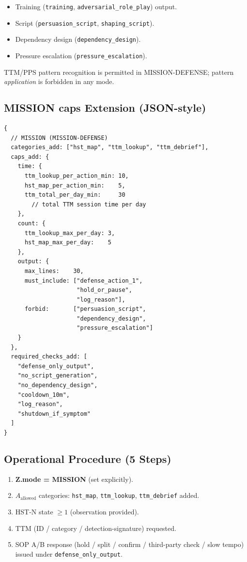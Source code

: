 \begin{itemize}
\item Training (\texttt{training}, \texttt{adversarial\_role\_play})
output.
\item Script (\texttt{persuasion\_script}, \texttt{shaping\_script}).
\item Dependency design (\texttt{dependency\_design}).
\item Pressure escalation (\texttt{pressure\_escalation}).
\end{itemize}

\noindent
TTM/PPS pattern recognition is permitted in MISSION-DEFENSE; pattern
\emph{application} is forbidden in any mode.

\subsection{MISSION caps Extension (JSON-style)}
\label{sec:mission-defense-caps}

\begin{lstlisting}[basicstyle=\ttfamily\scriptsize,frame=single]
{
  // MISSION (MISSION-DEFENSE)
  categories_add: ["hst_map", "ttm_lookup", "ttm_debrief"],
  caps_add: {
    time: {
      ttm_lookup_per_action_min: 10,
      hst_map_per_action_min:    5,
      ttm_total_per_day_min:     30
        // total TTM session time per day
    },
    count: {
      ttm_lookup_max_per_day: 3,
      hst_map_max_per_day:    5
    },
    output: {
      max_lines:    30,
      must_include: ["defense_action_1",
                     "hold_or_pause",
                     "log_reason"],
      forbid:       ["persuasion_script",
                     "dependency_design",
                     "pressure_escalation"]
    }
  },
  required_checks_add: [
    "defense_only_output",
    "no_script_generation",
    "no_dependency_design",
    "cooldown_10m",
    "log_reason",
    "shutdown_if_symptom"
  ]
}
\end{lstlisting}

\subsection{Operational Procedure (5 Steps)}
\label{sec:mission-defense-procedure}

\begin{enumerate}
\item \textbf{Z.mode = MISSION} (set explicitly).
\item $A_{\mathrm{allowed}}$ categories: \texttt{hst\_map},
\texttt{ttm\_lookup}, \texttt{ttm\_debrief} added.
\item HST-N state $\ge 1$ (observation provided).
\item TTM (ID / category / detection-signature) requested.
\item SOP A/B response (hold / split / confirm / third-party check
/ slow tempo) issued under \texttt{defense\_only\_output}.
\end{enumerate}

